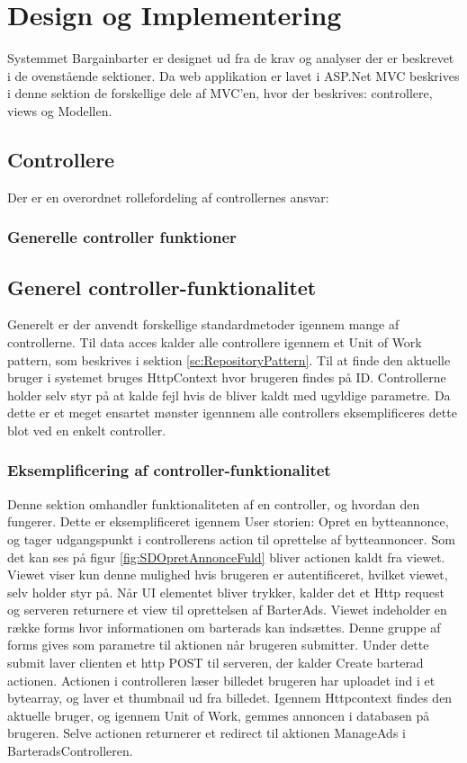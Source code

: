 
\chapter{Design og Implementering}\label{ch:Design}
Systemmet Bargainbarter er designet ud fra de krav og analyser der er beskrevet i de ovenstående sektioner. Da web applikation er lavet i ASP.Net MVC beskrives i denne sektion de forskellige dele af MVC'en, hvor der beskrives: controllere, views og Modellen. 


\section{Controllere}
Der er en overordnet rollefordeling af controllernes ansvar: 




\subsection{Generelle controller funktioner}\label{sc:GenerelControl}


\section{Generel controller-funktionalitet}


Generelt er der anvendt forskellige standardmetoder igennem mange af controllerne. Til data acces kalder alle controllere igennem et Unit of Work pattern, som beskrives i sektion \ref{sc:RepositoryPattern}. Til at finde den aktuelle bruger i systemet bruges HttpContext hvor brugeren findes på ID. Controllerne holder selv styr på at kalde fejl hvis de bliver kaldt med ugyldige parametre. Da dette er et meget ensartet mønster igennnem alle controllers eksemplificeres dette blot ved en enkelt controller.

\subsection{Eksemplificering af controller-funktionalitet}
Denne sektion omhandler funktionaliteten af en controller, og hvordan den fungerer. Dette er eksemplificeret igennem User storien: Opret en bytteannonce, og tager udgangspunkt i controllerens action til oprettelse af bytteannoncer.
Som det kan ses på figur \ref{fig:SDOpretAnnonceFuld} bliver actionen kaldt fra viewet. Viewet viser kun denne mulighed hvis brugeren er autentificeret, hvilket viewet, selv holder styr på. Når UI elementet bliver trykker, kalder det et Http request og serveren returnere et view til oprettelsen af BarterAds. Viewet indeholder en række forms hvor informationen om barterads kan indsættes. Denne gruppe af forms gives som parametre til aktionen når brugeren submitter. Under dette submit laver clienten et http POST til serveren, der kalder Create barterad actionen. Actionen i controlleren læser billedet brugeren har uploadet ind i et bytearray, og laver et thumbnail ud fra billedet. Igennem Httpcontext findes den aktuelle bruger, og igennem Unit of Work, gemmes annoncen i databasen på brugeren. Selve actionen returnerer et redirect til aktionen ManageAds i BarteradsControlleren. 

